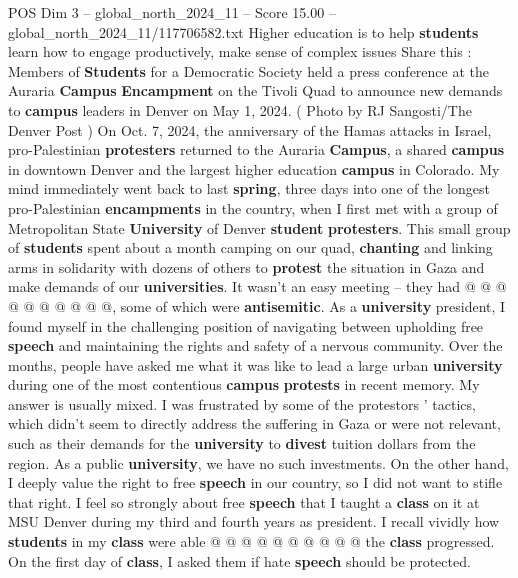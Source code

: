 \begin{textsample}{POS Dim 3 – global\_north\_2024\_11 – Score 15.00 – global\_north\_2024\_11/117706582.txt}  \label{ex:f3_pos_177}
Higher education is to help \textbf{students} learn how to engage productively, make sense of complex issues Share this : Members of \textbf{Students} for a Democratic Society held a press conference at the Auraria \textbf{Campus} \textbf{Encampment} on the Tivoli Quad to announce new demands to \textbf{campus} leaders in Denver on May 1, 2024. ( Photo by RJ Sangosti/The Denver Post ) On Oct. 7, 2024, the anniversary of the Hamas attacks in Israel, pro-Palestinian \textbf{protesters} returned to the Auraria \textbf{Campus}, a shared \textbf{campus} in downtown Denver and the largest higher education \textbf{campus} in Colorado.
My mind immediately went back to last \textbf{spring}, three days into one of the longest pro-Palestinian \textbf{encampments} in the country, when I first met with a group of Metropolitan State \textbf{University} of Denver \textbf{student} \textbf{protesters}.
This small group of \textbf{students} spent about a month camping on our quad, \textbf{chanting} and linking arms in solidarity with dozens of others to \textbf{protest} the situation in Gaza and make demands of our \textbf{universities}.
It wasn't an easy meeting -- they had @ @ @ @ @ @ @ @ @ @, some of which were \textbf{antisemitic}.
As a \textbf{university} president, I found myself in the challenging position of navigating between upholding free \textbf{speech} and maintaining the rights and safety of a nervous community.
Over the months, people have asked me what it was like to lead a large urban \textbf{university} during one of the most contentious \textbf{campus} \textbf{protests} in recent memory.
My answer is usually mixed.
I was frustrated by some of the protestors ' tactics, which didn't seem to directly address the suffering in Gaza or were not relevant, such as their demands for the \textbf{university} to \textbf{divest} tuition dollars from the region.
As a public \textbf{university}, we have no such investments.
On the other hand, I deeply value the right to free \textbf{speech} in our country, so I did not want to stifle that right.
I feel so strongly about free \textbf{speech} that I taught a \textbf{class} on it at MSU Denver during my third and fourth years as president.
I recall vividly how \textbf{students} in my \textbf{class} were able @ @ @ @ @ @ @ @ @ @ the \textbf{class} progressed.
On the first day of \textbf{class}, I asked them if hate \textbf{speech} should be protected.

\end{textsample}

